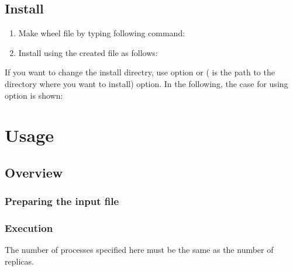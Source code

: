 \documentclass[letterpaper,10pt,english]{sphinxmanual}
\begin{document}
\section{Install}
\label{\detokenize{install/install:install}}\begin{enumerate}
\item {} 
Make wheel file by typing following command:

\end{enumerate}

\begin{enumerate}
\setcounter{enumi}{1}
\item {} 
Install using the created file as follows:

\end{enumerate}


If you want to change the install directry, use
 option or  (  is the path to the directory where you want to install) option. In the following, the case for using  option is shown:



\chapter{Usage}
\label{\detokenize{how_to_use/index:usage}}\label{\detokenize{how_to_use/index::doc}}

\section{Overview}
\label{\detokenize{how_to_use/basic_usage:overview}}\label{\detokenize{how_to_use/basic_usage::doc}}

\subsection{Preparing the input file}
\label{\detokenize{how_to_use/basic_usage:preparing-the-input-file}}

\subsection{Execution}
\label{\detokenize{how_to_use/basic_usage:execution}}
The number of processes specified here must be the same as the number of replicas.
\end{document}

